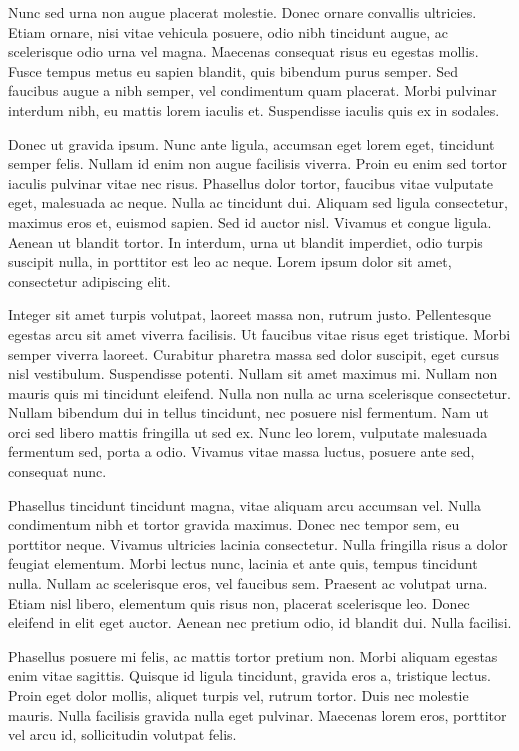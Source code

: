 Nunc sed urna non augue placerat molestie. Donec ornare convallis
ultricies. Etiam ornare, nisi vitae vehicula posuere, odio nibh
tincidunt augue, ac scelerisque odio urna vel magna. Maecenas
consequat risus eu egestas mollis. Fusce tempus metus eu sapien
blandit, quis bibendum purus semper. Sed faucibus augue a nibh semper,
vel condimentum quam placerat. Morbi pulvinar interdum nibh, eu mattis
lorem iaculis et. Suspendisse iaculis quis ex in sodales. 

Donec ut gravida ipsum. Nunc ante ligula, accumsan eget lorem eget,
tincidunt semper felis. Nullam id enim non augue facilisis viverra.
Proin eu enim sed tortor iaculis pulvinar vitae nec risus. Phasellus
dolor tortor, faucibus vitae vulputate eget, malesuada ac neque. Nulla
ac tincidunt dui. Aliquam sed ligula consectetur, maximus eros et,
euismod sapien. Sed id auctor nisl. Vivamus et congue ligula. Aenean
ut blandit tortor. In interdum, urna ut blandit imperdiet, odio turpis
suscipit nulla, in porttitor est leo ac neque. Lorem ipsum dolor sit
amet, consectetur adipiscing elit. 

Integer sit amet turpis volutpat, laoreet massa non, rutrum justo.
Pellentesque egestas arcu sit amet viverra facilisis. Ut faucibus
vitae risus eget tristique. Morbi semper viverra laoreet. Curabitur
pharetra massa sed dolor suscipit, eget cursus nisl vestibulum.
Suspendisse potenti. Nullam sit amet maximus mi. Nullam non mauris
quis mi tincidunt eleifend. Nulla non nulla ac urna scelerisque
consectetur. Nullam bibendum dui in tellus tincidunt, nec posuere nisl
fermentum. Nam ut orci sed libero mattis fringilla ut sed ex. Nunc leo
lorem, vulputate malesuada fermentum sed, porta a odio. Vivamus vitae
massa luctus, posuere ante sed, consequat nunc. 

Phasellus tincidunt tincidunt magna, vitae aliquam arcu accumsan vel.
Nulla condimentum nibh et tortor gravida maximus. Donec nec tempor
sem, eu porttitor neque. Vivamus ultricies lacinia consectetur. Nulla
fringilla risus a dolor feugiat elementum. Morbi lectus nunc, lacinia
et ante quis, tempus tincidunt nulla. Nullam ac scelerisque eros, vel
faucibus sem. Praesent ac volutpat urna. Etiam nisl libero, elementum
quis risus non, placerat scelerisque leo. Donec eleifend in elit eget
auctor. Aenean nec pretium odio, id blandit dui. Nulla facilisi. 

Phasellus posuere mi felis, ac mattis tortor pretium non. Morbi
aliquam egestas enim vitae sagittis. Quisque id ligula tincidunt,
gravida eros a, tristique lectus. Proin eget dolor mollis, aliquet
turpis vel, rutrum tortor. Duis nec molestie mauris. Nulla facilisis
gravida nulla eget pulvinar. Maecenas lorem eros, porttitor vel arcu
id, sollicitudin volutpat felis. 

